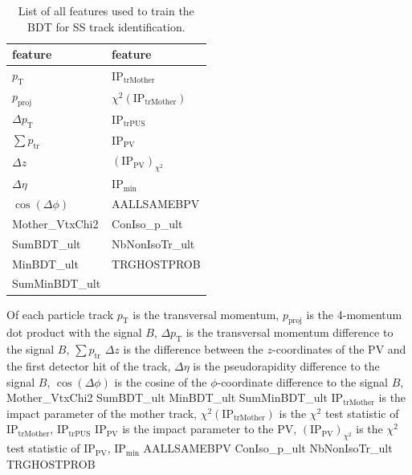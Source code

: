 \begin{table}
    \centering
    \caption{List of all features used to train the BDT for SS track identification.}
    \label{tab:SS_features}
    \begin{tabular}{l l}
        \toprule
        feature & feature \\
        \midrule
        $p_\text{T}$        & $\text{IP}_\text{trMother}$ \\ 
        $p_\text{proj}$     & $\chi^2(\text{IP}_\text{trMother})$ \\ 
        $\Delta p_\text{T}$ & $\text{IP}_\text{trPUS}$ \\ 
        $\sum p_\text{tr}$  & $\text{IP}_\text{PV}$ \\    
        $\Delta z$          & $(\text{IP}_\text{PV})_{\chi^2}$ \\ 
        $\Delta \eta$       & $\text{IP}_\text{min}$ \\ 
        $\cos(\Delta \phi)$ & AALLSAMEBPV \\ 
        Mother\_VtxChi2     & ConIso\_p\_ult \\
        SumBDT\_ult         & NbNonIsoTr\_ult \\ 
        MinBDT\_ult         & TRGHOSTPROB \\ 
        SumMinBDT\_ult      &  \\
        \bottomrule
    \end{tabular}
\end{table}

Of each particle track 
$p_\text{T}$ is the transversal momentum, 
$p_\text{proj}$ is the 4-momentum dot product with the signal $B$,
$\Delta p_\text{T}$ is the transversal momentum difference to the signal $B$,
$\sum p_\text{tr}$ 
$\Delta z$ is the difference between the $z$-coordinates of the PV and the first detector hit of the track,        
$\Delta \eta$ is the pseudorapidity difference to the signal $B$,     
$\cos(\Delta \phi)$ is the cosine of the $\phi$-coordinate difference to the signal $B$, 
Mother\_VtxChi2    
SumBDT\_ult        
MinBDT\_ult        
SumMinBDT\_ult
$\text{IP}_\text{trMother}$ is the impact parameter of the mother track, 
$\chi^2(\text{IP}_\text{trMother})$ is the $\chi^2$ test statistic of $\text{IP}_\text{trMother}$,
$\text{IP}_\text{trPUS}$ 
$\text{IP}_\text{PV}$ is the impact parameter to the PV,    
$(\text{IP}_\text{PV})_{\chi^2}$ is the $\chi^2$ test statistic of $\text{IP}_\text{PV}$,
$\text{IP}_\text{min}$  
AALLSAMEBPV  
ConIso\_p\_ult 
NbNonIsoTr\_ult  
TRGHOSTPROB      


